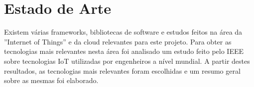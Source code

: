 \chapter{Estado de Arte}

Existem várias frameworks, bibliotecas de software e estudos feitos na área da ''Internet of Things'' e da cloud relevantes para este projeto. Para obter as tecnologias mais relevantes nesta área foi analisado um estudo \cite{ieeesurvey} feito pelo IEEE sobre tecnologias IoT utilizadas por engenheiros a nível mundial. A partir destes resultados, as tecnologias mais relevantes foram escolhidas e um resumo geral sobre as mesmas foi elaborado.


